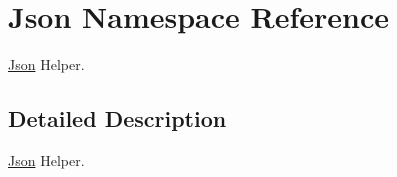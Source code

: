 \hypertarget{namespace_json}{\section{Json Namespace Reference}
\label{namespace_json}
}


\hyperlink{namespace_json}{Json} Helper.  




\subsection{Detailed Description}
\hyperlink{namespace_json}{Json} Helper. 